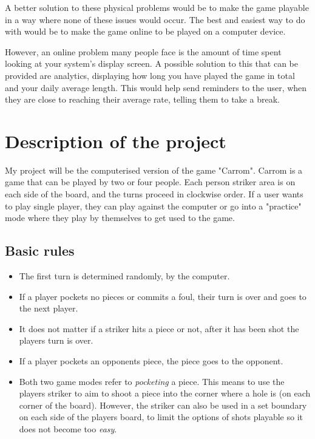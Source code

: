 \documentclass[11pt,a4paper]{report}
\begin{document}
\noindent A better solution to these physical problems would be to make the game playable in a way where none of these issues would occur. The best and easiest way to do with would be to make the game online to be played on a computer device. \newline

\noindent However, an online problem many people face is the amount of time spent looking at your system's display screen. A possible solution to this that can be provided are analytics, displaying how long you have played the game in total and your daily average length. This would help send reminders to the user, when they are close to reaching their average rate, telling them to take a break.

\section{Description of the project}
My project will be the computerised version of the game "Carrom". Carrom is a game that can be played by two or four people. Each person striker area is on each side of the board, and the turns proceed in clockwise order. If a user wants to play single player, they can play against the computer or go into a "practice" mode where they play by themselves to get used to the game.

\subsection{Basic rules}
\begin{itemize}
  \item The first turn is determined randomly, by the computer.
  \item If a player pockets no pieces or commits a foul, their turn is over and goes to the next player.
  \item It does not matter if a striker hits a piece or not, after it has been shot the players turn is over.
  \item If a player pockets an opponents piece, the piece goes to the opponent.
  \item Both two game modes refer to \textit{pocketing} a piece. This means to use the players striker to aim to shoot a piece into the corner where a hole is (on each corner of the board). However, the striker can also be used in a set boundary on each side of the players board, to limit the options of shots playable so it does not become too \textit{easy}.
\end{itemize}
\end{document}

